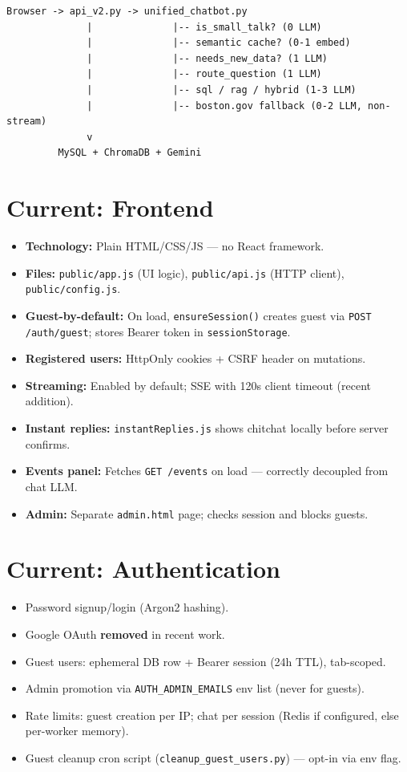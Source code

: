 \documentclass[11pt,a4paper]{article}
\begin{document}
\begin{verbatim}
Browser -> api_v2.py -> unified_chatbot.py
              |              |-- is_small_talk? (0 LLM)
              |              |-- semantic cache? (0-1 embed)
              |              |-- needs_new_data? (1 LLM)
              |              |-- route_question (1 LLM)
              |              |-- sql / rag / hybrid (1-3 LLM)
              |              |-- boston.gov fallback (0-2 LLM, non-stream)
              v
         MySQL + ChromaDB + Gemini
\end{verbatim}

\section{Current: Frontend}

\begin{itemize}
  \item \textbf{Technology:} Plain HTML/CSS/JS --- no React framework.
  \item \textbf{Files:} \texttt{public/app.js} (UI logic), \texttt{public/api.js} (HTTP client), \texttt{public/config.js}.
  \item \textbf{Guest-by-default:} On load, \texttt{ensureSession()} creates guest via \texttt{POST /auth/guest}; stores Bearer token in \texttt{sessionStorage}.
  \item \textbf{Registered users:} HttpOnly cookies + CSRF header on mutations.
  \item \textbf{Streaming:} Enabled by default; SSE with 120s client timeout (recent addition).
  \item \textbf{Instant replies:} \texttt{instantReplies.js} shows chitchat locally before server confirms.
  \item \textbf{Events panel:} Fetches \texttt{GET /events} on load --- correctly decoupled from chat LLM.
  \item \textbf{Admin:} Separate \texttt{admin.html} page; checks session and blocks guests.
\end{itemize}

\section{Current: Authentication}

\begin{itemize}
  \item Password signup/login (Argon2 hashing).
  \item Google OAuth \textbf{removed} in recent work.
  \item Guest users: ephemeral DB row + Bearer session (24h TTL), tab-scoped.
  \item Admin promotion via \texttt{AUTH\_ADMIN\_EMAILS} env list (never for guests).
  \item Rate limits: guest creation per IP; chat per session (Redis if configured, else per-worker memory).
  \item Guest cleanup cron script (\texttt{cleanup\_guest\_users.py}) --- opt-in via env flag.
\end{itemize}
\end{document}
